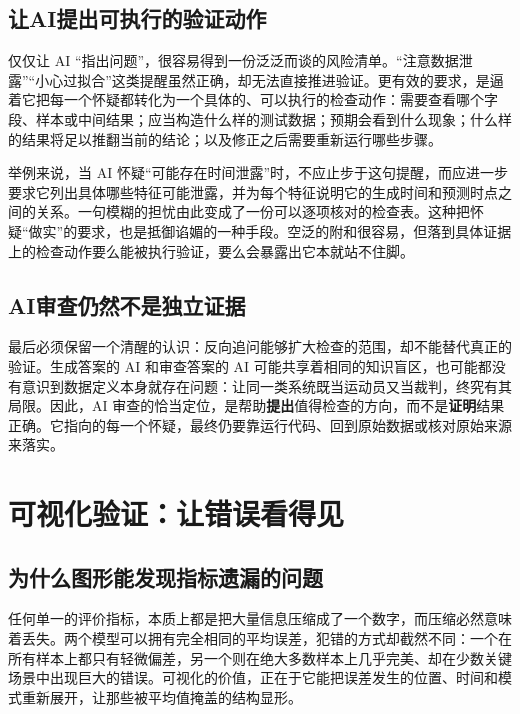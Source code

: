 \subsection{让AI提出可执行的验证动作}

仅仅让 AI “指出问题”，很容易得到一份泛泛而谈的风险清单。“注意数据泄露”“小心过拟合”这类提醒虽然正确，却无法直接推进验证。更有效的要求，是逼着它把每一个怀疑都转化为一个具体的、可以执行的检查动作：需要查看哪个字段、样本或中间结果；应当构造什么样的测试数据；预期会看到什么现象；什么样的结果将足以推翻当前的结论；以及修正之后需要重新运行哪些步骤。

举例来说，当 AI 怀疑“可能存在时间泄露”时，不应止步于这句提醒，而应进一步要求它列出具体哪些特征可能泄露，并为每个特征说明它的生成时间和预测时点之间的关系。一句模糊的担忧由此变成了一份可以逐项核对的检查表。这种把怀疑“做实”的要求，也是抵御谄媚的一种手段。空泛的附和很容易，但落到具体证据上的检查动作要么能被执行验证，要么会暴露出它本就站不住脚。

\subsection{AI审查仍然不是独立证据}

最后必须保留一个清醒的认识：反向追问能够扩大检查的范围，却不能替代真正的验证。生成答案的 AI 和审查答案的 AI 可能共享着相同的知识盲区，也可能都没有意识到数据定义本身就存在问题：让同一类系统既当运动员又当裁判，终究有其局限。因此，AI 审查的恰当定位，是帮助\textbf{提出}值得检查的方向，而不是\textbf{证明}结果正确。它指向的每一个怀疑，最终仍要靠运行代码、回到原始数据或核对原始来源来落实。

\section{可视化验证：让错误看得见}

\subsection{为什么图形能发现指标遗漏的问题}

任何单一的评价指标，本质上都是把大量信息压缩成了一个数字，而压缩必然意味着丢失。两个模型可以拥有完全相同的平均误差，犯错的方式却截然不同：一个在所有样本上都只有轻微偏差，另一个则在绝大多数样本上几乎完美、却在少数关键场景中出现巨大的错误。可视化的价值，正在于它能把误差发生的位置、时间和模式重新展开，让那些被平均值掩盖的结构显形。


